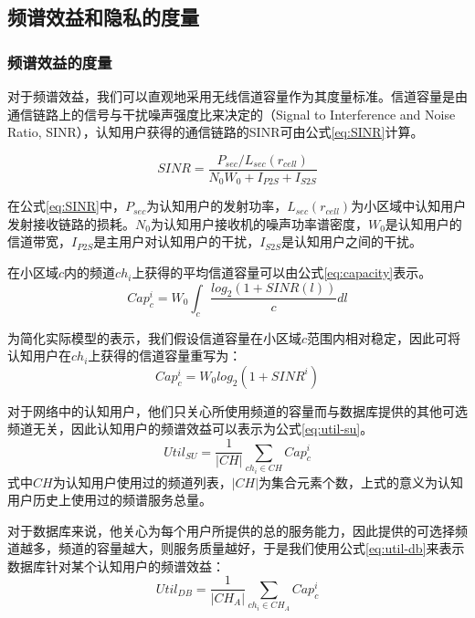 \subsection{频谱效益和隐私的度量}

\subsubsection{频谱效益的度量}

对于频谱效益，我们可以直观地采用无线信道容量作为其度量标准。信道容量是由通信链路上的信号与干扰噪声强度比来决定的（Signal to Interference and Noise Ratio, SINR），认知用户获得的通信链路的SINR可由公式\ref{eq:SINR}计算\cite{capacity}。

\begin{equation}\label{eq:SINR}
SINR  = \frac{P_{sec}/L_{sec}(r_{cell})}{N_{0}W_{0}+I_{P2S}+I_{S2S}}
\end{equation}

在公式\ref{eq:SINR}中，$P_{sec}$为认知用户的发射功率，$L_{sec}(r_{cell})$为小区域中认知用户发射接收链路的损耗。$N_{0}$为认知用户接收机的噪声功率谱密度，$W_{0}$是认知用户的信道带宽，$I_{P2S}$是主用户对认知用户的干扰，$I_{S2S}$是认知用户之间的干扰。

在小区域$c$内的频道$ch_{i}$上获得的平均信道容量可以由公式\ref{eq:capacity}表示\cite{capacity}。
\begin{equation}\label{eq:capacity}
Cap_{c}^{i}  = W_{0} \int_{c} \frac{log_{2}(1+SINR(l))}{c}dl
\end{equation}

为简化实际模型的表示，我们假设信道容量在小区域$c$范围内相对稳定，因此可将认知用户在$ch_{i}$上获得的信道容量重写为：
\begin{equation}\label{eq:capacity-revised}
Cap_{c}^{i}  = W_{0} log_{2}(1+SINR^{i})
\end{equation}

对于网络中的认知用户，他们只关心所使用频道的容量而与数据库提供的其他可选频道无关，因此认知用户的频谱效益可以表示为公式\ref{eq:util-su}。
\begin{equation}\label{eq:util-su}
Util_{SU}=\frac{1}{|CH|}\sum\limits_{ch_{i} \in CH} Cap_{c}^{i}
\end{equation}
式中$CH$为认知用户使用过的频道列表，$|CH|$为集合元素个数，上式的意义为认知用户历史上使用过的频谱服务总量。


对于数据库来说，他关心为每个用户所提供的总的服务能力，因此提供的可选择频道越多，频道的容量越大，则服务质量越好，于是我们使用公式\ref{eq:util-db}来表示数据库针对某个认知用户的频谱效益：
\begin{equation}\label{eq:util-db}
Util_{DB}=\frac{1}{|CH_{A}|} \sum\limits_{ch_{i} \in CH_{A}} Cap_{c}^{i}
\end{equation}

